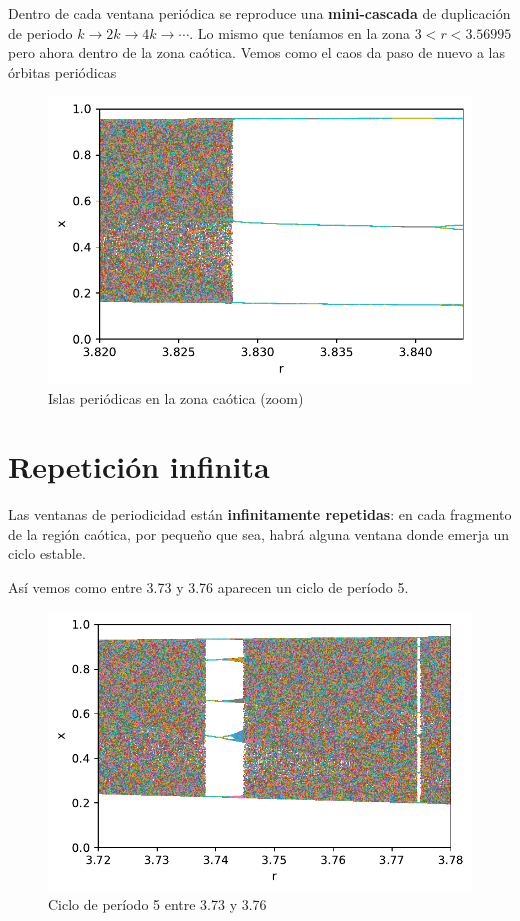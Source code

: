 \documentclass[
  10pt,
  a4paper,
  DIV=11,
  numbers=noendperiod,
  open=any]{scrreprt}
\numberwithin{equation}{chapter}
\numberwithin{equation}{section}
\renewcommand{\[}{\begin{equation}}
\renewcommand{\]}{\end{equation}}
\begin{document}
Dentro de cada ventana periódica se reproduce una \textbf{mini-cascada}
de duplicación de periodo \(k \to 2k \to 4k \to \cdots\). Lo mismo que
teníamos en la zona \(3 < r < 3.56995\) pero ahora dentro de la zona
caótica. Vemos como el caos da paso de nuevo a las órbitas periódicas

\begin{figure}[h]
  \centering
  \includegraphics[keepaspectratio]{01-logistica/Caos_files/figure-pdf/cell-5-output-1.pdf}
  \caption{Islas periódicas en la zona caótica (zoom)}
\end{figure}

\section{Repetición infinita}\label{repeticiuxf3n-infinita}

Las ventanas de periodicidad están \textbf{infinitamente repetidas}: en
cada fragmento de la región caótica, por pequeño que sea, habrá alguna
ventana donde emerja un ciclo estable.

Así vemos como entre 3.73 y 3.76 aparecen un ciclo de período 5.


\begin{figure}[h]
  \centering
  \includegraphics[keepaspectratio]{01-logistica/Caos_files/figure-pdf/cell-6-output-1.pdf}
  \caption{Ciclo de período 5 entre 3.73 y 3.76}
\end{figure}
\end{document}

